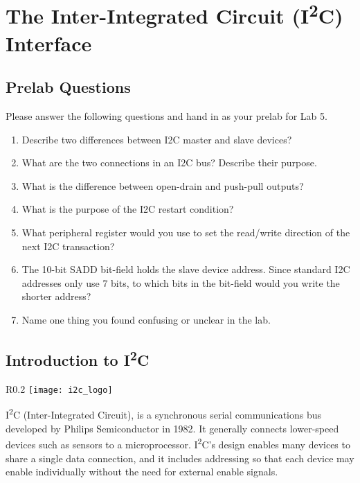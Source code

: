 \documentclass[openany,11pt,fleqn]{book} %
\begin{document}
	
\chapter{The Inter-Integrated Circuit (I\textsuperscript{2}C) Interface}

\section{\color{blue}Prelab Questions}
\begin{question}[Prelab 5]
	Please answer the following questions and hand in as your prelab for Lab 5.
	\begin{enumerate}
		\item Describe two differences between I2C master and slave devices?
		\item What are the two connections in an I2C bus? Describe their purpose.
		\item What is the difference between open-drain and push-pull outputs?
		\item What is the purpose of the I2C restart condition?
		\item What peripheral register would you use to set the read/write direction of the next I2C transaction?
		\item The 10-bit SADD bit-field holds the slave device address. Since standard I2C addresses only use 7 bits, to which bits in the bit-field would you write the shorter address?
		\item Name one thing you found confusing or unclear in the lab.
		
	\end{enumerate}
\end{question}

\section{\color{orange}Introduction to I\textsuperscript{2}C}
    \begin{wrapfigure}{R}{0.2\textwidth}
        \centering\texttt{[image: i2c\_logo]}
    \end{wrapfigure}

    I\textsuperscript{2}C (Inter-Integrated Circuit), is a synchronous serial communications bus developed by Philips Semiconductor in 1982. It generally connects lower-speed devices such as sensors to a microprocessor. I\textsuperscript{2}C's design enables many devices to share a single data connection, and it includes addressing so that each device may enable individually without the need for external enable signals.
    
\end{document}
